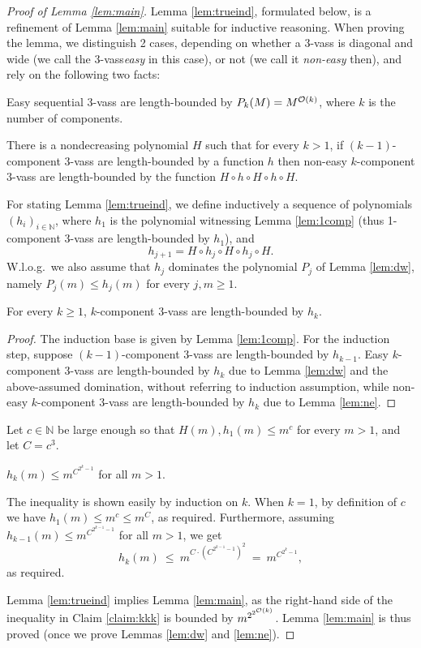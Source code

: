\documentclass[a4paper, UKenglish, cleveref, autoref, thm-restate]{lipics-v2021}
\newcommand{\N}{\mathbb{N}}
\newcommand{\lb}{length-bounded\xspace}
\newcommand{\kbound}[2]{{#1}^{2^{2^{#2}}}}
\newcommand{\OO}{{\cal O}}
\newcommand{\vass}{{\sc vass}\xspace}
\newcommand{\tvass}{\parvass 3}
\newcommand{\parvass}[1]{{$#1$-\vass}\xspace}
\newcommand{\Wlog}{W.l.o.g.~}
\begin{document}
\begin{proof}[Proof of Lemma \ref{lem:main}]
Lemma \ref{lem:trueind}, formulated below, is a refinement of Lemma \ref{lem:main} suitable for 
inductive reasoning.
When proving the lemma, we distinguish 2 cases, depending on whether
a \tvass  is diagonal and wide (we call the \tvass \emph{easy} in this case), 
or not (we call it \emph{non-easy} then), and rely on the following two facts:
\begin{lemma} \label{lem:dw}
Easy sequential \tvass are \lb by $P_k(M) = M^{\OO(k)}$, where $k$ is the number of components.
\end{lemma}
\begin{lemma} \label{lem:ne}
There is a nondecreasing polynomial $H$ such that for every $k > 1$,
if $(k-1)$-component \tvass are \lb by a function $h$ then
non-easy $k$-component \tvass are \lb by the function $H \circ h \circ H \circ h \circ H$.
\end{lemma}
For stating Lemma \ref{lem:trueind},
we define inductively a sequence of polynomials $(h_i)_{i\in\N}$, where
$h_1$ is the polynomial witnessing Lemma \ref{lem:1comp}
(thus 1-component \tvass are \lb by $h_1$), and
\[
h_{j+1} = H \circ h_j \circ H \circ h_j \circ H.
\]
\Wlog we also assume that $h_j$ dominates the polynomial $P_j$ of Lemma \ref{lem:dw}, namely
$P_j(m) \leq h_j(m)$ for every $j,m\geq 1$.

\begin{lemma} \label{lem:trueind}
For every $k\geq 1$, 
$k$-component \tvass are \lb by $h_k$.
\end{lemma}
\begin{proof}
The induction base is given by Lemma \ref{lem:1comp}.
For the induction step, suppose $(k-1)$-component \tvass are \lb by $h_{k-1}$.
Easy $k$-component \tvass are \lb by $h_k$ due to Lemma \ref{lem:dw} and the above-assumed domination, 
without referring to induction assumption,
while non-easy $k$-component \tvass are \lb by $h_k$ due to Lemma \ref{lem:ne}.
\end{proof}
Let $c\in\N$ be large enough so that $H(m), h_1(m) \leq m^{c}$ for every $m>1$,
and let $C=c^3$.
\begin{claim} \label{claim:kkk}
$h_{k}(m) \leq {m}^{C^{2^{k} -1}}$ for all $m > 1$.
\end{claim}
\begin{appendixproof}
The inequality is shown easily by induction on $k$.
When $k=1$, by definition of $c$ we have $h_1(m) \leq m^c\leq m^C$, as required.
Furthermore, assuming
$h_{k-1}(m) \leq {m}^{C^{2^{k-1} -1}}$ for all $m>1$, we get
\[
h_k(m) \ \leq \ {m}^{C\cdot (C^{2^{k-1} -1})^2} 
\ = \ m^{C^{2^k-1}},
\]
as required.
\end{appendixproof}
Lemma \ref{lem:trueind} implies Lemma \ref{lem:main}, 
as the right-hand side of the inequality in Claim \ref{claim:kkk} is bounded by $\kbound {m} {\OO(k)}$.
Lemma \ref{lem:main} is thus proved (once we prove Lemmas \ref{lem:dw} and \ref{lem:ne}).
\end{proof}
\end{document}
